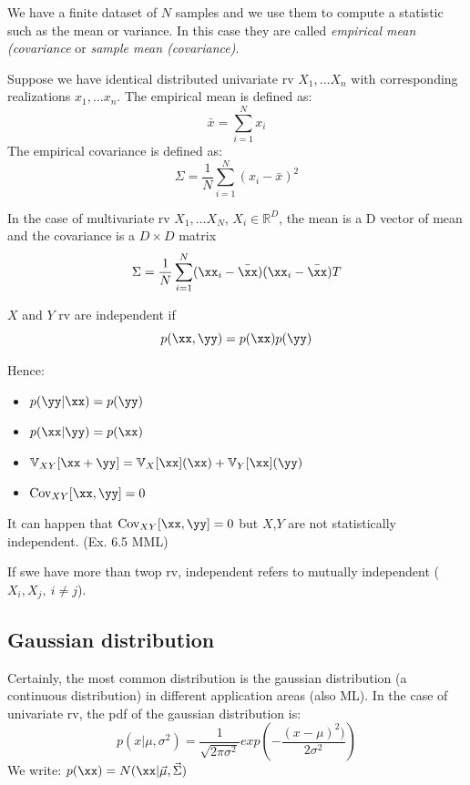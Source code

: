 
We have a finite dataset of $N$ samples and we use them to compute a statistic such as the mean or variance. In this case they are called \textit{empirical mean (covariance} or \textit{sample mean (covariance)}.

\begin{definition}
Suppose we have identical distributed univariate rv $X_1, \ldots X_n$ with corresponding realizations $x_1, \ldots x_n$. The empirical mean is defined as:
$$\bar x=\sum_{i=1}^N x_i $$
The empirical covariance is defined as:
$$\Sigma=\frac{1}{N} \sum_{i=1}^N (x_i-\bar x)^2$$
\end{definition}
In the case of multivariate rv $X_1, \ldots X_N$, $X_i \in \mathbb{R}^D$, the mean is a D vector of mean and the covariance is a $D \times D$ matrix 
$$\Sigma=\frac{1}{N} \sum_{i=1}^N (\xx_i-\bar \xx) (\xx_i-\bar \xx)T$$


\begin{definition}
$X$ and $Y$ rv are independent if $$p(\xx,\yy)=p(\xx)p(\yy)$$
\end{definition}

Hence:
\begin{itemize}
    \item $p(\yy|\xx)=p(\yy)$
    \item $p(\xx|\yy)=p(\xx)$
    \item $\mathbb{V}_{XY}{[\xx+\yy]}=\mathbb{V}_X[\xx](\xx)+\mathbb{V}_Y[\xx](\yy)$
    \item $\text{Cov}_{XY}[\xx,\yy]=0$
\end{itemize}

It can happen that $\text{Cov}_{XY}[\xx,\yy]=0$ but $X$,$Y$ are not statistically independent. (Ex. 6.5 MML)

If swe have more than twop rv, independent refers to mutually independent ($X_i, X_j, \ i\neq j$).

\subsection{Gaussian distribution}

Certainly, the most common distribution is the gaussian distribution (a continuous distribution) in different application areas (also ML).
In the case of univariate rv, the pdf of the gaussian distribution is:
$$p(x|\mu, \sigma^2)=\frac{1}{\sqrt{2 \pi \sigma^2}} exp \left(-\frac{(x-\mu)^2)}{2\sigma^2}\right)$$
We write: $p(\xx)={N} (\xx|\vec{\mu},\vec{\Sigma})$

